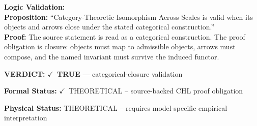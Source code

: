 \textbf{Logic Validation:}\\
\textbf{Proposition:} ``Category-Theoretic Isomorphism Across Scales is valid when its objects and arrows close
under the stated categorical construction.''\\
\textbf{Proof:} The source statement is read as a categorical construction. The proof obligation is
closure: objects must map to admissible objects, arrows must compose, and the named
invariant must survive the induced functor.

\textbf{VERDICT:} \ensuremath{\checkmark}\ \textbf{TRUE} --- categorical-closure validation

\textbf{Formal Status:} \ensuremath{\checkmark}\ THEORETICAL -- source-backed CHL proof obligation

\textbf{Physical Status:} THEORETICAL -- requires model-specific empirical interpretation
\par\vspace{0.45em}
\par
\ifTZPDarkEdition
{}
\fi
\endgroup
\endgroup

